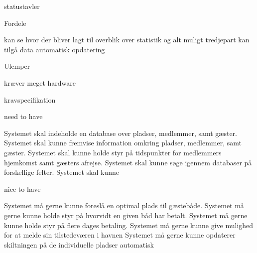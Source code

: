 statustavler

Fordele


kan se hvor der bliver lagt til
overblik over statistik og alt muligt
tredjepart kan tilgå data
automatisk opdatering



Ulemper

kræver meget hardware



kravspecifikation

need to have

Systemet skal indeholde en database over pladser, medlemmer, samt gæster.
Systemet skal kunne fremvise information omkring pladser, medlemmer, samt gæster.
Systemet skal kunne holde styr på tidspunkter for medlemmers hjemkomst samt gæsters afrejse.
Systemet skal kunne søge igennem databaser på forskellige felter.
Systemet skal kunne 

nice to have

Systemet må gerne kunne foreslå en optimal plads til gæstebåde.
Systemet må gerne kunne holde styr på hvorvidt en given båd har betalt.
Systemet må gerne kunne holde styr på flere dages betaling.
Systemet må gerne kunne give mulighed for at melde sin tilstedeværen i havnen
Systemet må gerne kunne opdaterer skiltningen på de individuelle pladser automatisk

